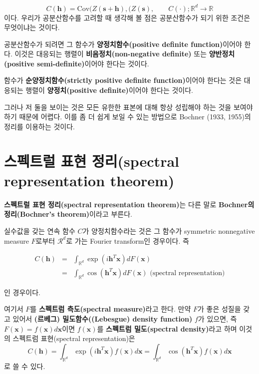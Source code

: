 \documentclass[b5paper,]{book}
\theoremstyle{definition}
\theoremstyle{definition}
\theoremstyle{definition}
\theoremstyle{remark}
\let\BeginKnitrBlock\begin \let\EndKnitrBlock\end
\begin{document}
\[C(\mathbf{h})=\text{Cov}(Z(\mathbf{s}+\mathbf{h}), (Z(\mathbf{s}), \qquad{C(\cdot); \mathbb{R}^{d} \rightarrow \mathbb{R}}\]
이다. 우리가 공분산함수를 고려할 때 생각해 볼 점은 공분산함수가 되기
위한 조건은 무엇이냐는 것이다.

공분산함수가 되려면 그 함수가 \textbf{양정치함수(positive definite
function)}이어야 한다. 이것은 대응되는 행렬이
\textbf{비음정치(non-negative definite)} 또는 \textbf{양반정치(positive
semi-definite)}이어야 한다는 것이다.

함수가 \textbf{순양정치함수(strictly positive definite function)}이어야
한다는 것은 대응되는 행렬이 \textbf{양정치(positive definite)}이어야
한다는 것이다.

그러나 저 둘을 보이는 것은 모든 유한한 표본에 대해 항상 성립해야 하는
것을 보여야하기 때문에 어렵다. 이를 좀 더 쉽게 보일 수 있는 방법으로
Bochner (1933, 1955)의 정리를 이용하는 것이다.

\section{스펙트럴 표현 정리(spectral representation
theorem)}\label{--spectral-representation-theorem}

\textbf{스펙트럴 표현 정리(spectral representation theorem)}는 다른 말로
\textbf{Bochner의 정리(Bochner's theorem)}이라고 부른다.

\BeginKnitrBlock{theorem}[스펙트럴 표현 정리]
\protect\hypertarget{thm:unnamed-chunk-180}{}{\label{thm:unnamed-chunk-180}
{} }실수값을 갖는 연속 함수 \(C\)가
양정치함수라는 것은 그 함수가 symmetric nonnegative measure \(F\)로부터
\(\mathcal{R}^{d}\)로 가는 Fourier transform인 경우이다. 즉

\begin{eqnarray}
C(\mathbf{h})&=&\int_{\mathbb{R}^{d}}\exp(i\mathbf{h}^{T}\mathbf{x})dF(\mathbf{x})\nonumber\\
&=&\int_{\mathbb{R}^{d}}\cos(\mathbf{h}^{T}\mathbf{x})dF(\mathbf{x}) \text{ (spectral representation)}
\end{eqnarray}

인 경우이다.
\EndKnitrBlock{theorem}

여기서 \(F\)를 \textbf{스펙트럼 측도(spectral measure)}라고 한다. 만약
\(F\)가 좋은 성질을 갖고 있어서 \textbf{(르베그) 밀도함수((Lebesgue)
density function)} \(f\)가 있으면, 즉
\(F(\mathbf{x})=f(\mathbf{x})d\mathbf{x}\)이면 \(f(\mathbf{x})\)를
\textbf{스펙트럼 밀도(spectral density)}라고 하며 이것의 스펙트럼
표현(spectral representation)은 \[
C(\mathbf{h})=\int_{\mathbb{R}^{d}}\exp(i\mathbf{h}^{T}\mathbf{x})f(\mathbf{x})d\mathbf{x}=\int_{\mathbb{R}^{d}}\cos(\mathbf{h}^{T}\mathbf{x})f(\mathbf{x})d\mathbf{x}
\] 로 쓸 수 있다.
\end{document}
